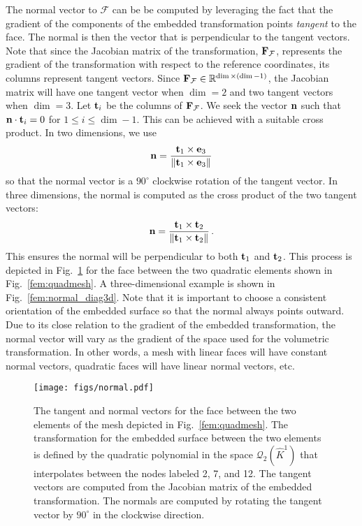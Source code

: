 \documentclass[../doc.tex]{subfiles}
\begin{document}
The normal vector to $\mathcal{F}$ can be be computed by leveraging the fact that the gradient of the components of the embedded transformation points \emph{tangent} to the face. The normal is then the vector that is perpendicular to the tangent vectors. Note that since the Jacobian matrix of the transformation, $\boldsymbol{\mathrm{F}}_\mathcal{F}$, represents the gradient of the transformation with respect to the reference coordinates, its columns represent tangent vectors. Since $\boldsymbol{\mathrm{F}}_\mathcal{F} \in \mathbb{R}^{\dim \times (\dim-1)}$, the Jacobian matrix will have one tangent vector when $\dim = 2$ and two tangent vectors when $\dim = 3$. Let $\boldsymbol{\mathrm{t}}_i$ be the columns of $\boldsymbol{\mathrm{F}}_\mathcal{F}$. We seek the vector $\boldsymbol{\mathrm{n}}$ such that $\boldsymbol{\mathrm{n}} \cdot \boldsymbol{\mathrm{t}}_i = 0$ for $1\leq i \leq \dim-1$. This can be achieved with a suitable cross product. In two dimensions, we use 
	\begin{equation}
		\boldsymbol{\mathrm{n}} = \frac{\boldsymbol{\mathrm{t}}_1 \times \boldsymbol{\mathrm{e}}_3}{\| \boldsymbol{\mathrm{t}}_1 \times \boldsymbol{\mathrm{e}}_3 \|} 
	\end{equation}
so that the normal vector is a $90^\circ$ clockwise rotation of the tangent vector. In three dimensions, the normal is computed as the cross product of the two tangent vectors: 
	\begin{equation}
		\boldsymbol{\mathrm{n}} = \frac{\boldsymbol{\mathrm{t}}_1 \times \boldsymbol{\mathrm{t}}_2}{\|\boldsymbol{\mathrm{t}}_1 \times \boldsymbol{\mathrm{t}}_2\|} \,. 
	\end{equation}
This ensures the normal will be perpendicular to both $\boldsymbol{\mathrm{t}}_1$ and $\boldsymbol{\mathrm{t}}_2$. This process is depicted in Fig.~\ref{fem:normal_diag} for the face between the two quadratic elements shown in Fig.~\ref{fem:quadmesh}. A three-dimensional example is shown in Fig.~\ref{fem:normal_diag3d}. Note that it is important to choose a consistent orientation of the embedded surface so that the normal always points outward. 
Due to its close relation to the gradient of the embedded transformation, the normal vector will vary as the gradient of the space used for the volumetric transformation. In other words, a mesh with linear faces will have constant normal vectors, quadratic faces will have linear normal vectors, etc. 
\begin{figure}
\centering
\texttt{[image: figs/normal.pdf]}
\caption{The tangent and normal vectors for the face between the two elements of the mesh depicted in Fig.~\ref{fem:quadmesh}. The transformation for the embedded surface between the two elements is defined by the quadratic polynomial in the space $\mathcal{Q}_2(\hat{K}^1)$ that interpolates between the nodes labeled 2, 7, and 12. The tangent vectors are computed from the Jacobian matrix of the embedded transformation. The normals are computed by rotating the tangent vector by $90^\circ$ in the clockwise direction.}
\label{fem:normal_diag}
\end{figure}
\end{document}
